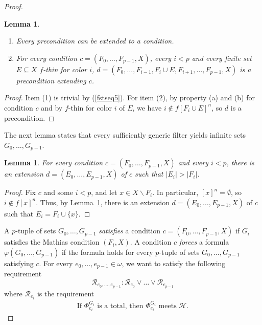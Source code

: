 \documentclass{amsart}
\newtheorem{lemma}[theorem]{Lemma}
\theoremstyle{definition}
\theoremstyle{remark}
\numberwithin{equation}{section}
\theoremstyle{noparens}
\newcommand{\Hcal}{\mathcal{H}}
\newcommand{\Rcal}{\mathcal{R}}
\renewcommand{\setminus}{\smallsetminus}
\begin{document}
\begin{proof}
\begin{lemma}\label{lem:ts-n-strongly-double-immune-assuming-combi}
\
\begin{enumerate}
\item Every precondition can be extended to a condition.
\item For every condition $c = (F_0, \dots, F_{p-1}, X)$,
every $i < p$ and every finite set $E \subseteq X$ $f$-thin for color $i$,
  $d = (F_0, \dots, F_{i-1}, F_i \cup E, F_{i+1}, \dots, F_{p-1}, X)$
is a precondition extending $c$.
\end{enumerate}
\end{lemma}
\begin{proof}
Item (1) is trivial by (\ref{fstseq5}).
For item (2),
by property (a) and (b) for condition $c$ and by $f$-thin for color $i$ of $E$,
we have $i\notin f[F_i\cup E]^n$,
so $d$ is a precondition.
\end{proof}

The next lemma states that every sufficiently generic filter yields
infinite sets $G_0, \dots, G_{p-1}$.

\begin{lemma}\label{lem:ts-n-strongly-double-immune-assuming-force-Q}
For every condition $c = (F_0, \dots, F_{p-1}, X)$ and every $i < p$,
there is an extension $d = (E_0, \dots, E_{p-1}, X)$ of $c$ such that
$|E_i| > |F_i|$.
\end{lemma}
\begin{proof}
Fix $c$ and some $i < p$, and let $x\in X\setminus F_i$.
In particular, $[x]^n = \emptyset$, so $i \not \in f[x]^n$.
Thus, by Lemma~\ref{lem:ts-n-strongly-double-immune-assuming-combi},
there is an extension $d = (E_0, \dots, E_{p-1}, X)$ of $c$ such that
$E_i = F_i \cup \{x\}$.
\end{proof}

A $p$-tuple of sets $G_0, \dots, G_{p-1}$ \emph{satisfies} a condition
$c = (F_0, \dots, F_{p-1}, X)$ if $G_i$ satisfies the Mathias condition $(F_i, X)$.
A condition $c$ \emph{forces} a formula $\varphi(G_0, \dots, G_{p-1})$
if the formula holds for every $p$-tuple of sets $G_0, \dots, G_{p-1}$ satisfying $c$.
For every $e_0, \dots, e_{p-1} \in \omega$, we want to satisfy the following requirement
$$
\Rcal_{e_0, \dots, e_{p-1}} : \Rcal_{e_0} \vee \dots \vee \Rcal_{e_{p-1}}
$$
where $\Rcal_{e_i}$ is the requirement
\begin{align}\nonumber
\text{If $\Phi^{  G_i}_{e_i}$ is a total,
then $\Phi^{  G_i}_{e_i}$ meets $\Hcal$.}
\end{align}


\end{proof}
\end{document}
